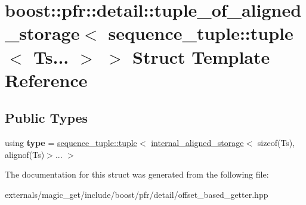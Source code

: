 \hypertarget{structboost_1_1pfr_1_1detail_1_1tuple__of__aligned__storage_3_01sequence__tuple_1_1tuple_3_01_ts_8_8_8_01_4_01_4}{}\section{boost\+:\+:pfr\+:\+:detail\+:\+:tuple\+\_\+of\+\_\+aligned\+\_\+storage$<$ sequence\+\_\+tuple\+:\+:tuple$<$ Ts... $>$ $>$ Struct Template Reference}
\label{structboost_1_1pfr_1_1detail_1_1tuple__of__aligned__storage_3_01sequence__tuple_1_1tuple_3_01_ts_8_8_8_01_4_01_4}
\subsection*{Public Types}
\begin{DoxyCompactItemize}
\item 
\mbox{\label{structboost_1_1pfr_1_1detail_1_1tuple__of__aligned__storage_3_01sequence__tuple_1_1tuple_3_01_ts_8_8_8_01_4_01_4_ac92445a5e035ea5daf91bf43516f66a9}} 
using {\bfseries type} = \mbox{\hyperlink{structboost_1_1pfr_1_1detail_1_1sequence__tuple_1_1tuple}{sequence\+\_\+tuple\+::tuple}}$<$ \mbox{\hyperlink{structboost_1_1pfr_1_1detail_1_1internal__aligned__storage}{internal\+\_\+aligned\+\_\+storage}}$<$ sizeof(Ts), alignof(Ts)$>$... $>$
\end{DoxyCompactItemize}


The documentation for this struct was generated from the following file\+:\begin{DoxyCompactItemize}
\item 
externals/magic\+\_\+get/include/boost/pfr/detail/offset\+\_\+based\+\_\+getter.\+hpp\end{DoxyCompactItemize}
